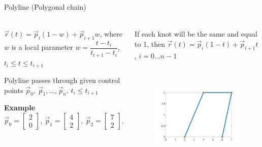 \documentclass[aspectratio=169,notes]{beamer}
\begin{document}
\begin{frame}[t]{Polyline (Polygonal chain)}
\framesubtitle{}
    \begin{columns}[T,onlytextwidth]
        \begin{column}{0.49\textwidth}
            $\vec{r}(t)=\vec{p}_i(1-w)+\vec{p}_{i+1}w$, where $w$ is a local parameter $w=\dfrac{t-t_i}{t_{t+1}-t_i}$, $t_i \leq t \leq t_{i+1}$

            Polyline passes through given control points $\vec{p}_0,\ \vec{p}_1, ..., \vec{p}_n$. $t_i \leq t_{i+1}$

            \textbf{Example}
            $\vec{p}_0 = \begin{bmatrix} 2\\ 0 \end{bmatrix},\ \vec{p}_1 = \begin{bmatrix} 4\\ 2 \end{bmatrix},\ \vec{p}_2 = \begin{bmatrix} 7\\ 2 \end{bmatrix},\ \vec{p}_3 = \begin{bmatrix} 6\\ 0 \end{bmatrix}$
        \end{column}
        \begin{column}{0.49\textwidth}
            If each knot will be the same and equal to 1, then  $\vec{r}(t)=\vec{p}_i(1-t)+\vec{p}_{i+1} t$, $i=0...n-1$
                \begin{figure}[H]
                    \centering\includegraphics[height=5cm,width=1\textwidth,keepaspectratio]{polyline_concrete.png}
                    \label{fig:polyline_concrete.png}
                \end{figure}
        \end{column}
    \end{columns}
\end{frame}
\end{document}
